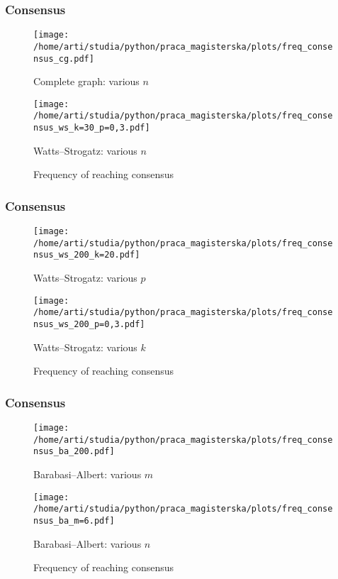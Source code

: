 \documentclass[a4paper, 11pt]{beamer}
\begin{document}
\begin{frame}
\frametitle{Consensus}
	\begin{figure}[ht]
		\begin{minipage}[b]{0.45\linewidth}
            \centering
            \texttt{[image: /home/arti/studia/python/praca\_magisterska/plots/freq\_consensus\_cg.pdf]}
            \caption{Complete graph: various $n$}
        \end{minipage}
        \hspace{0.5cm}
        \begin{minipage}[b]{0.45\linewidth}
            \centering
            \texttt{[image: /home/arti/studia/python/praca\_magisterska/plots/freq\_consensus\_ws\_k=30\_p=0,3.pdf]}
			\caption{Watts--Strogatz: various $n$}
        \end{minipage}
    \caption{Frequency of reaching consensus}
    \end{figure}
\end{frame}

\begin{frame}
\frametitle{Consensus}
	\begin{figure}[ht]
		\begin{minipage}[b]{0.45\linewidth}
            \centering
            \texttt{[image: /home/arti/studia/python/praca\_magisterska/plots/freq\_consensus\_ws\_200\_k=20.pdf]}
            \caption{Watts--Strogatz: various $p$}
        \end{minipage}
        \hspace{0.5cm}
        \begin{minipage}[b]{0.45\linewidth}
            \centering
            \texttt{[image: /home/arti/studia/python/praca\_magisterska/plots/freq\_consensus\_ws\_200\_p=0,3.pdf]}
			\caption{Watts--Strogatz: various $k$}
        \end{minipage}
    \caption{Frequency of reaching consensus}
    \end{figure}
\end{frame}

\begin{frame}
\frametitle{Consensus}
	\begin{figure}[ht]
		\begin{minipage}[b]{0.45\linewidth}
            \centering
            \texttt{[image: /home/arti/studia/python/praca\_magisterska/plots/freq\_consensus\_ba\_200.pdf]}
            \caption{Barabasi--Albert: various $m$}
        \end{minipage}
        \hspace{0.5cm}
        \begin{minipage}[b]{0.45\linewidth}
            \centering
            \texttt{[image: /home/arti/studia/python/praca\_magisterska/plots/freq\_consensus\_ba\_m=6.pdf]}
			\caption{Barabasi--Albert: various $n$}
        \end{minipage}
    \caption{Frequency of reaching consensus}
    \end{figure}
\end{frame}
\end{document}
